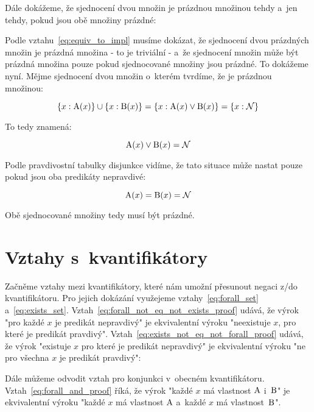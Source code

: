 
Dále dokážeme, že sjednocení dvou množin je prázdnou množinou tehdy a~jen tehdy, pokud jsou obě množiny prázdné:


Podle vztahu~\eqref{eq:equiv_to_impl} musíme dokázat, že sjednocení dvou prázdných množin je prázdná množina - to je triviální - a~že sjednocení množin může být prázdná množina pouze pokud sjednocované množiny jsou prázdné. To dokážeme nyní. Mějme sjednocení dvou množin o~kterém tvrdíme, že je prázdnou množinou:

\begin{equation}
\{x: \mathrm{A}(x)\} \cup \{x: \mathrm{B}(x)\} = \{x: \mathrm{A}(x) \lor \mathrm{B}(x)\} = \{x: \mathcal{N}\}
\end{equation}

To tedy znamená:

\begin{equation}
\mathrm{A}(x) \lor \mathrm{B}(x) = \mathcal{N}
\end{equation}

Podle pravdivostní tabulky disjunkce vidíme, že tato situace může nastat pouze pokud jsou oba predikáty nepravdivé:

\begin{equation}
\mathrm{A}(x) = \mathrm{B}(x) = \mathcal{N}
\end{equation}

Obě sjednocované množiny tedy musí být prázdné.

\section{Vztahy s~kvantifikátory}

Začněme vztahy mezi kvantifikátory, které nám umožní přesunout negaci z/do kvantifikátoru. Pro jejich dokázání využejeme
vztahy~\eqref{eq:forall_set} a~\eqref{eq:exists_set}. Vztah~\eqref{eq:forall_not_eq_not_exists_proof} udává, že výrok "pro každé \(x\) je predikát nepravdivý" je ekvivalentní výroku "neexistuje \(x\), pro které je predikát pravdivý". Vztah~\eqref{eq:exists_not_eq_not_forall_proof} udává, že výrok "existuje \(x\) pro které je predikát nepravdivý" je ekvivalentní výroku "ne pro všechna \(x\) je predikát pravdivý":


Dále můžeme odvodit vztah pro konjunkci v~obecném kvantifikátoru. Vztah~\eqref{eq:forall_and_proof} říká, že výrok "každé \(x\) má vlastnost \(\mathrm{A}\) i~\(\mathrm{B}\)" je ekvivalentní výroku "každé \(x\) má vlastnost \(\mathrm{A}\) a~každé \(x\) má vlastnost~\(\mathrm{B}\)".


